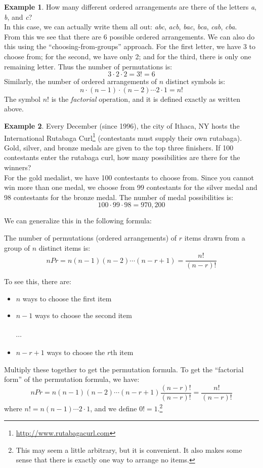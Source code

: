 \documentclass[12pt]{article}
\theoremstyle{definition}
\newtheorem*{example}{Example}
\theoremstyle{remark}
\begin{document}
\begin{example}How many different ordered arrangements are there of the letters \emph{a}, \emph{b}, and \emph{c}? \\

In this case, we can actually write them all out: \emph{abc}, \emph{acb}, \emph{bac}, \emph{bca}, \emph{cab}, \emph{cba}.\\
From this we see that there are 6 possible ordered arrangements. We can also do this using the ``choosing-from-groups'' approach. For the first letter, we have 3 to choose from; for the second, we have only 2; and for the third, there is only one remaining letter. Thus the number of permutations is:
\[
3 \cdot 2 \cdot 2 = 3! = 6
\]
Similarly, the number of ordered arrangements of $n$ distinct symbols is:
\[
n \cdot (n-1) \cdot (n-2) \cdots 2 \cdot 1 = n!
\]
The symbol $n!$ is the \emph{factorial} operation, and it is defined exactly as written above.
\end{example}

\begin{example}Every December (since 1996), the city of Ithaca, NY hosts the International Rutabaga Curl\footnote{\url{http://www.rutabagacurl.com}} (contestants must supply their own rutabaga). Gold, silver, and bronze medals are given to the top three finishers. If 100 contestants enter the rutabaga curl, how many possibilities are there for the winners?\\

For the gold medalist, we have 100 contestants to choose from. Since you cannot win more than one medal, we choose from 99 contestants for the silver medal and 98 contestants for the bronze medal. The number of medal possibilities is:
\[
100 \cdot 99 \cdot 98 = 970,200
\]
\end{example}

We can generalize this in the following formula:

\begin{framed}
The number of permutations (ordered arrangements) of $r$ items drawn from a group of $n$ distinct items is:
\[
nPr = n (n-1)(n-2)\cdots(n - r + 1) = \frac{n!}{(n-r)!}
\]
\end{framed}
To see this, there are:
\begin{itemize}
\item $n$ ways to choose the first item
\item $n-1$ ways to choose the second item\\ \\$\cdots$
\item $n - r + 1$ ways to choose the $r$th item
\end{itemize}
Multiply these together to get the permutation formula. To get the ``factorial form'' of the permutation formula, we have:
\[
nPr = n (n-1)(n-2)\cdots(n - r + 1)\frac{(n-r)!}{(n-r)!} = \frac{n!}{(n-r)!}
\]
where $n! = n(n-1)\cdots2\cdot1$, and we define $0! = 1.$\footnote{This may seem a little arbitrary, but it is convenient. It also makes some sense that there is exactly one way to arrange no items.}
\end{document}
